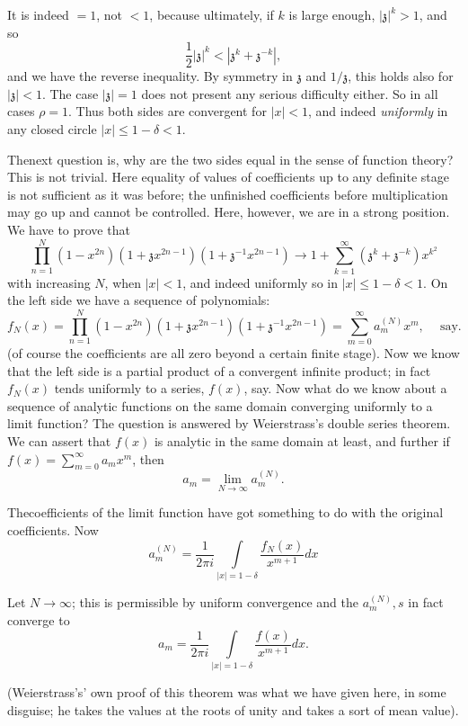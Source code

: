 It is indeed $=1$, not $<1$, because ultimately, if $k$ is large
enough, $|\mathfrak{z}|^k> 1$, and so
$$
\frac{1}{2} |\mathfrak{z}|^k< |\mathfrak{z}^k+ \mathfrak{z}^{-k}|,
$$
and we have the reverse inequality. By symmetry in $\mathfrak{z}$ and
$1/\mathfrak{z}$, this holds also for $|\mathfrak{z}|<1$. The case
$|\mathfrak{z}|=1$ does not present any serious difficulty either. So
in all cases $\rho=1$. Thus both sides are convergent for $|x|<1$, and
indeed \textit{uniformly} in any closed circle $|x|\leq 1-\delta <
1$. 

The\pageoriginale next question is, why are the two sides equal in
the sense of function theory? This is not trivial. Here equality of
values of coefficients up to any definite stage is not sufficient as
it was before; the unfinished coefficients before multiplication may
go up and cannot be controlled. Here, however, we are in a strong
position. We have to prove that
$$
\prod^N_{n=1} (1-x^{2n}) (1+ \mathfrak{z}x^{2n-1})(1+\mathfrak{z}^{-1}
x^{2n-1}) \to 1+ \sum^\infty_{k=1} (\mathfrak{z}^k +
\mathfrak{z}^{-k}) x^{k^2}
$$
with increasing $N$, when $|x|<1$, and indeed uniformly so in $|x|\leq
1 - \delta < 1$. On the left side we have a sequence of polynomials:
$$
f_N (x) = \prod^N_{n=1} (1-x^{2n})(1+\mathfrak{z} x^{2n-1})
(1+\mathfrak{z}^{-1} x^{2n-1}) = \sum^\infty_{m=0} a_m^{(N)} x^m,
~\quad\text{say}. 
$$
(of course the coefficients are all zero beyond a certain finite
stage). Now we know that the left side is a partial product of a
convergent infinite product; in fact $f_N(x)$ tends uniformly to a
series, $f (x)$, say. Now what do we know about a sequence of analytic
functions on the same domain converging uniformly to a limit function?
The question is answered by Weierstrass's double series theorem. We
can assert that $f(x)$ is analytic in the same domain at least, and
further if $f(x) = \sum\limits^\infty_{m=0} a_m x^m$, then
$$
a_m = \lim\limits_{N \to \infty} a_m^{(N)}.
$$

The\pageoriginale coefficients of the limit function have got
something to do with the original coefficients. Now
$$
a_m^{(N)}= \frac{1}{2 \pi i} \int\limits_{|x|=1-\delta} \frac{f_N(x)}{x^{m+1}}dx
$$

Let $N \to \infty$; this is permissible by uniform convergence and the
$a_m^{(N)}, s$ in fact converge to 
$$
a_m = \frac{1}{2 \pi i} \int\limits_{|x|=1-\delta} \frac{f(x)}{x^{m+1}}dx.
$$

(Weierstrass's' own proof of this theorem was what we have given here,
in some disguise; he takes the values at the roots of unity and takes
a sort of mean value).

